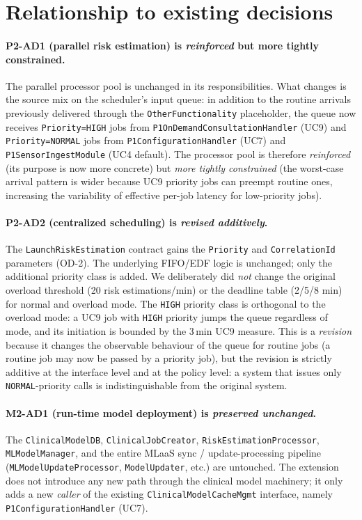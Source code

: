 \section{Relationship to existing decisions}

\paragraph{P2-AD1 (parallel risk estimation) is \emph{reinforced} but
more tightly constrained.}
The parallel processor pool is unchanged in its responsibilities. What
changes is the source mix on the scheduler's input queue: in addition to
the routine arrivals previously delivered through the
\texttt{OtherFunctionality} placeholder, the queue now receives
\texttt{Priority=HIGH} jobs from \texttt{P1OnDemandConsultationHandler}
(UC9) and \texttt{Priority=NORMAL} jobs from
\texttt{P1ConfigurationHandler} (UC7) and \texttt{P1SensorIngestModule}
(UC4 default). The processor pool is therefore \emph{reinforced} (its
purpose is now more concrete) but \emph{more tightly constrained}
(the worst-case arrival pattern is wider because UC9 priority jobs can
preempt routine ones, increasing the variability of effective per-job
latency for low-priority jobs).

\paragraph{P2-AD2 (centralized scheduling) is \emph{revised additively}.}
The \texttt{LaunchRiskEstimation} contract gains the \texttt{Priority}
and \texttt{CorrelationId} parameters (OD-2). The underlying FIFO/EDF
logic is unchanged; only the additional priority class is added. We
deliberately did \emph{not} change the original overload threshold (20
risk estimations/min) or the deadline table (2/5/8 min) for normal and
overload mode. The \texttt{HIGH} priority class is orthogonal to the
overload mode: a UC9 job with \texttt{HIGH} priority jumps the queue
regardless of mode, and its initiation is bounded by the 3\,min UC9
measure. This is a \emph{revision} because it changes the observable
behaviour of the queue for routine jobs (a routine job may now be passed
by a priority job), but the revision is strictly additive at the
interface level and at the policy level: a system that issues only
\texttt{NORMAL}-priority calls is indistinguishable from the original
system.

\paragraph{M2-AD1 (run-time model deployment) is \emph{preserved
unchanged}.}
The \texttt{ClinicalModelDB}, \texttt{ClinicalJobCreator},
\texttt{RiskEstimationProcessor}, \texttt{MLModelManager}, and the entire
MLaaS sync / update-processing pipeline (\texttt{MLModelUpdateProcessor},
\texttt{ModelUpdater}, etc.) are untouched. The extension does not
introduce any new path through the clinical model machinery; it only
adds a new \emph{caller} of the existing \texttt{ClinicalModelCacheMgmt}
interface, namely \texttt{P1ConfigurationHandler} (UC7).


